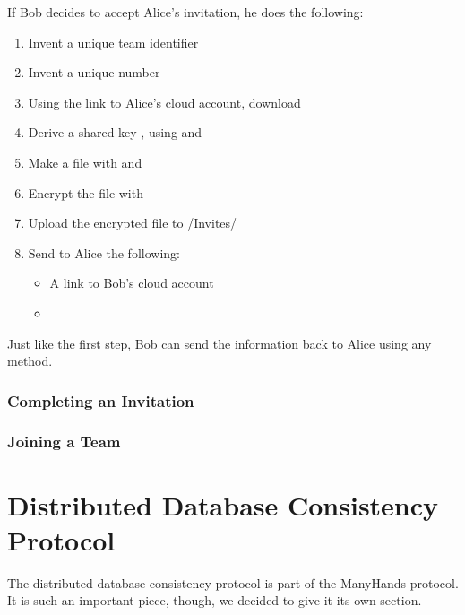 \documentclass[pldi,10pt,preprint]{sigplanconf-pldi16}
\begin{document}
If Bob decides to accept Alice's invitation, he does the following:

\begin{enumerate}
\item Invent a unique team identifier 
\item Invent a unique number 
\item Using the link to Alice's cloud account, download 
\item Derive a shared key , using  and 
\item Make a file with  and 
\item Encrypt the file with 
\item Upload the encrypted file to /Invites/
\item Send to Alice the following:
  \begin{itemize}
  \item A link to Bob's cloud account
  \item {}
  \end{itemize}
\end{enumerate}

Just like the first step, Bob can send the information back to Alice using any method.

\subsubsection{Completing an Invitation}

\subsubsection{Joining a Team}

\section{Distributed Database Consistency Protocol}

The distributed database consistency protocol is part of the ManyHands protocol.
It is such an important piece, though, we decided to give it its own section.
\end{document}
